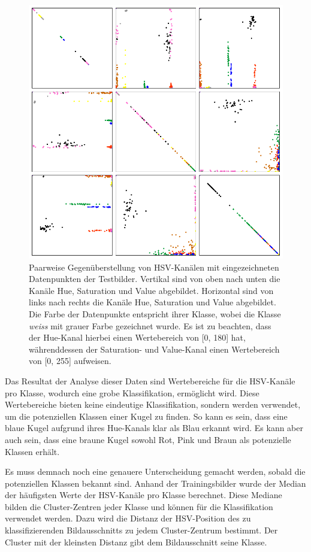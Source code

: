 \begin{figure}[h!]
    \begin{center}
        \includegraphics[width=0.7\linewidth]{../common/03_billiard_ai/resources/classification/Cluster_all.png}
    \end{center}
    \caption{
        Paarweise Gegenüberstellung von HSV-Kanälen mit eingezeichneten Datenpunkten der Testbilder.
        Vertikal sind von oben nach unten die Kanäle Hue, Saturation und Value abgebildet.
        Horizontal sind von links nach rechts die Kanäle Hue, Saturation und Value abgebildet.
        Die Farbe der Datenpunkte entspricht ihrer Klasse, wobei die Klasse \emph{weiss} mit grauer Farbe gezeichnet wurde.
        Es ist zu beachten, dass der Hue-Kanal hierbei einen Wertebereich von [0, 180] hat, währenddessen
        der Saturation- und Value-Kanal einen Wertebereich von [0, 255] aufweisen.
    }
    \label{fig:klassifikation_cluster}
\end{figure}

Das Resultat der Analyse dieser Daten sind Wertebereiche für die HSV-Kanäle pro Klasse, wodurch eine grobe Klassifikation,
ermöglicht wird.
Diese Wertebereiche bieten keine eindeutige Klassifikation, sondern werden verwendet, um die potenziellen
Klassen einer Kugel zu finden.
So kann es sein, dass eine blaue Kugel aufgrund ihres Hue-Kanals klar als Blau erkannt wird.
Es kann aber auch sein, dass eine braune Kugel sowohl Rot, Pink und Braun als potenzielle Klassen erhält.

Es muss demnach noch eine genauere Unterscheidung gemacht werden, sobald die potenziellen Klassen bekannt sind.
Anhand der Trainingsbilder wurde der Median der häufigsten Werte der HSV-Kanäle pro Klasse berechnet.
Diese Mediane bilden die Cluster-Zentren jeder Klasse und können für die Klassifikation verwendet werden.
Dazu wird die Distanz der HSV-Position des zu klassifizierenden Bildausschnitts zu jedem Cluster-Zentrum bestimmt.
Der Cluster mit der kleinsten Distanz gibt dem Bildausschnitt seine Klasse.

